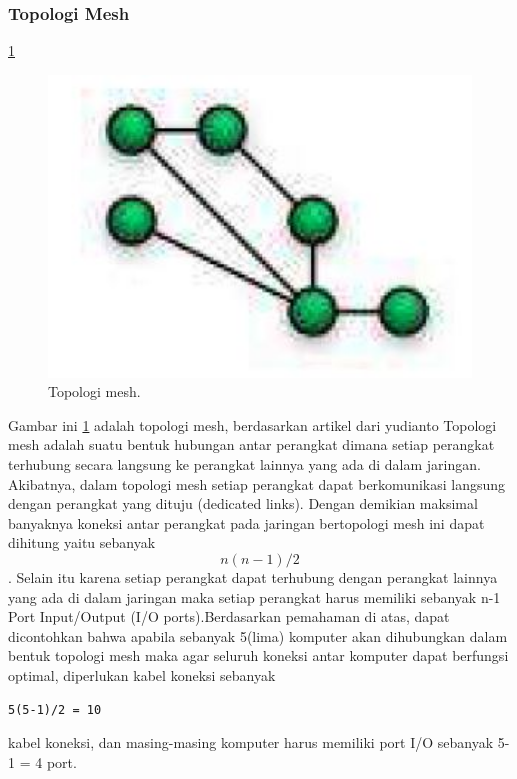   \subsubsection{Topologi Mesh}
    \ref{mesh}
    \begin{figure}[ht]
    \centerline{\includegraphics[width=1\textwidth]{figures/mesh.JPG}}
    \caption{Topologi mesh.}
    \label{mesh}
    \end{figure}
    Gambar ini \ref{mesh} adalah topologi mesh, berdasarkan artikel dari yudianto Topologi mesh adalah suatu bentuk hubungan antar perangkat dimana setiap perangkat terhubung secara langsung ke perangkat lainnya yang ada di dalam jaringan\cite{yudianto2007jaringan}. Akibatnya, dalam topologi mesh setiap perangkat dapat berkomunikasi langsung dengan perangkat yang dituju (dedicated links). Dengan demikian maksimal banyaknya koneksi antar perangkat pada jaringan bertopologi mesh ini dapat dihitung yaitu sebanyak \begin{equation}n(n-1)/2\end{equation}. 
    Selain itu karena setiap perangkat dapat terhubung dengan perangkat lainnya yang ada di dalam jaringan maka setiap perangkat harus memiliki sebanyak n-1 Port Input/Output (I/O ports).Berdasarkan pemahaman di atas, dapat dicontohkan bahwa apabila sebanyak 5(lima) komputer akan dihubungkan dalam bentuk topologi mesh maka agar seluruh koneksi antar komputer dapat berfungsi optimal, diperlukan kabel koneksi sebanyak \begin{verbatim}5(5-1)/2 = 10 \end{verbatim} kabel koneksi, dan masing-masing komputer harus memiliki port I/O sebanyak 5-1 = 4 port.
